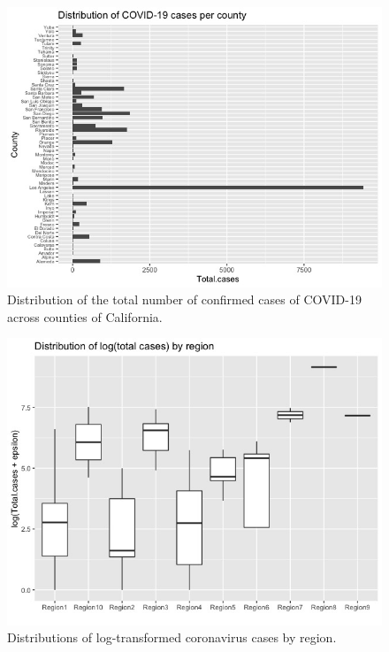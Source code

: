 \documentclass[11pt,twocolumn]{asaproc}
\begin{document}
\begin{figure}[t]
\centering\includegraphics[scale=.30]{infected_per_county.jpeg}
\caption{Distribution of the total number of confirmed cases of COVID-19 across counties of California.}
\label{fig:totcases}
\end{figure}

\begin{figure}[t]
\centering\includegraphics[scale=.31]{tot_cases_boxplot.jpeg}
\caption{Distributions of log-transformed coronavirus cases by region.}
\label{fig:boxplots}
\end{figure}
\end{document}
